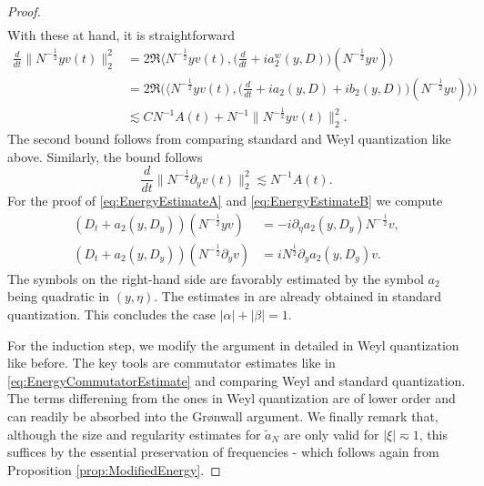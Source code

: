 \documentclass{amsart}
\numberwithin{equation}{section}
\theoremstyle{definition}
\begin{document}
\begin{proof}
\begin{align}
\end{align}
With these at hand, it is straightforward
\begin{equation*}
    \begin{split}
    \frac{d}{dt} \| N^{-\frac{1}{2}} y v(t) \|_2^2 &= 2 \Re \langle N^{-\frac{1}{2}} y v(t) , \big( \frac{d}{dt} + i a_2^w(y,D)) (N^{-\frac{1}{2}} y v) \rangle \\
    &= 2 \Re ( \langle N^{-\frac{1}{2}} y v(t), \big( \frac{d}{dt} + i a_2(y,D)+ i b_2(y,D) \big) (N^{-\frac{1}{2}} y v) \rangle \big) \\
    &\lesssim C N^{-1} A(t) + N^{-1} \| N^{-\frac{1}{2}} y v(t) \|_2^2.
    \end{split}
\end{equation*}
The second bound follows from comparing standard and Weyl quantization like above. Similarly, the bound follows
\begin{equation*}
    \frac{d}{dt} \| N^{-\frac{1}{2}} \partial_y v(t) \|_2^2 \lesssim N^{-1} A(t).
\end{equation*}
For the proof of \eqref{eq:EnergyEstimateA} and \eqref{eq:EnergyEstimateB} we compute
\begin{equation}
\label{eq:EnergyCommutatorEstimate}
\begin{split}
    (D_t + a_2(y,D_y)) (N^{-\frac{1}{2}} y v) &= - i \partial_{\eta} a_2(y,D_y) N^{-\frac{1}{2}} v, \\
    (D_t + a_2(y,D_y)) (N^{-\frac{1}{2}} \partial_y v) &= i N^{\frac{1}{2}} \partial_y a_2(y,D_y) v.
    \end{split}
\end{equation}
The symbols on the right-hand side are favorably estimated by the symbol $a_2$ being quadratic in $(y,\eta)$. The estimates in \cite{SchippaTataru2025} are already obtained in standard quantization. This concludes the case $|\alpha| + |\beta| = 1$. 

For the induction step, we modify the argument in \cite{SchippaTataru2025} detailed in Weyl quantization like before. The key tools are commutator estimates like in \eqref{eq:EnergyCommutatorEstimate} and comparing Weyl and standard quantization. The terms differening from the ones in Weyl quantization are of lower order and can readily be absorbed into the Gr\o nwall argument.
We finally remark that, although the size and regularity estimates for $\tilde{a}_N$ are only valid for $|\xi| \eqsim 1$, this suffices by the essential preservation of frequencies - which follows again from Proposition \ref{prop:ModifiedEnergy}.
\end{proof}
\end{document}
